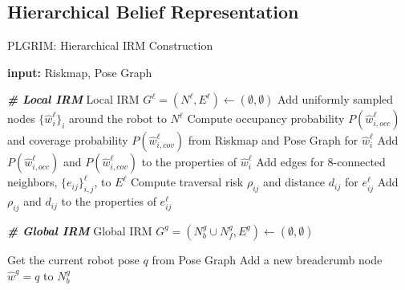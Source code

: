 \documentclass[letterpaper]{article} %
\begin{document}
\subsection{Hierarchical Belief Representation} \label{ssec:belief-managers}

\begin{algorithm}[t!]
{\fontsize{8.5pt}{9.8pt}\selectfont
\caption{PLGRIM: Hierarchical IRM Construction}
\label{alg:IRMs}
\begin{algorithmic}
  \STATE \textbf{input:} Riskmap, Pose Graph %

  \vspace{3pt}
  \STATE \textbf{\textit{\# Local IRM}}
  \STATE Local IRM $G^\ell = (N^\ell, E^\ell) \gets (\emptyset, \emptyset)$
  \STATE Add uniformly sampled nodes $\{\hat{w}^\ell_i\}_i$ around the robot to $N^\ell$
    \STATE Compute occupancy probability $P(\hat{w}^\ell_{i,occ})$ and coverage probability $P(\hat{w}^\ell_{i,cov})$ from Riskmap and Pose Graph for $\hat{w}^\ell_i$
    \STATE Add $P(\hat{w}^\ell_{i,occ})$ and $P(\hat{w}^\ell_{i,cov})$ to the properties of $\hat{w}^\ell_i$
  \ENDFOR
  \STATE Add edges for 8-connected neighbors, $\{e_{ij}\}^\ell_{i,j}$, to $E^\ell$
    \STATE Compute traversal risk $\rho_{ij}$ and distance $d_{ij}$ for $e^\ell_{ij}$
    \STATE Add $\rho_{ij}$ and $d_{ij}$ to the properties of $e^\ell_{ij}$
  \ENDFOR

  \vspace{3pt}
  \STATE \textbf{\textit{\# Global IRM}}
    \STATE Global IRM $G^g = (N^g_b \cup N^g_f, E^g) \gets (\emptyset, \emptyset)$
  \ENDIF
  
  \STATE Get the current robot pose $q$ from Pose Graph
    \STATE Add a new breadcrumb node $\hat{w}^g = q$ to $N^g_b$
  \ENDIF



\end{algorithmic}}
\end{algorithm}
\end{document}
